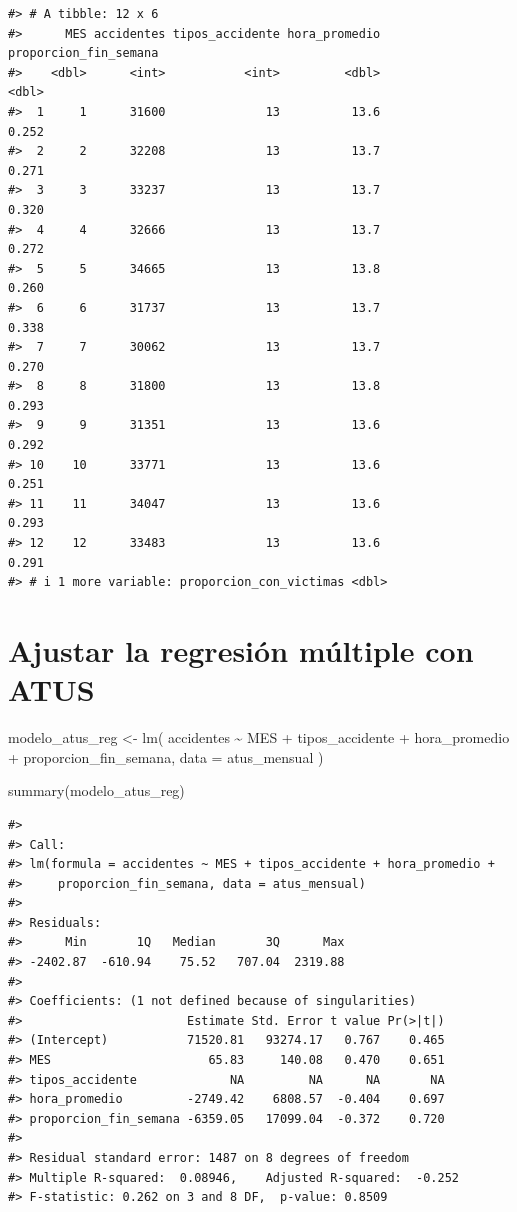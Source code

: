 \documentclass[
  spanish,
  10.5pt,
  letterpaper,
  openany,
  headings=big]{scrbook}
\newenvironment{Shaded}{}{}
\newcommand{\AttributeTok}[1]{\textcolor[rgb]{0.84,0.23,0.29}{#1}}
\newcommand{\FunctionTok}[1]{\textcolor[rgb]{0.44,0.26,0.76}{#1}}
\newcommand{\NormalTok}[1]{\textcolor[rgb]{0.14,0.16,0.18}{#1}}
\newcommand{\OtherTok}[1]{\textcolor[rgb]{0.44,0.26,0.76}{#1}}
\newcommand{\SpecialCharTok}[1]{\textcolor[rgb]{0.00,0.36,0.77}{#1}}
\begin{document}
\begin{verbatim}
#> # A tibble: 12 x 6
#>      MES accidentes tipos_accidente hora_promedio proporcion_fin_semana
#>    <dbl>      <int>           <int>         <dbl>                 <dbl>
#>  1     1      31600              13          13.6                 0.252
#>  2     2      32208              13          13.7                 0.271
#>  3     3      33237              13          13.7                 0.320
#>  4     4      32666              13          13.7                 0.272
#>  5     5      34665              13          13.8                 0.260
#>  6     6      31737              13          13.7                 0.338
#>  7     7      30062              13          13.7                 0.270
#>  8     8      31800              13          13.8                 0.293
#>  9     9      31351              13          13.6                 0.292
#> 10    10      33771              13          13.6                 0.251
#> 11    11      34047              13          13.6                 0.293
#> 12    12      33483              13          13.6                 0.291
#> # i 1 more variable: proporcion_con_victimas <dbl>
\end{verbatim}

\section{Ajustar la regresión múltiple con
ATUS}\label{ajustar-la-regresiuxf3n-muxfaltiple-con-atus}

\begin{Shaded}
\begin{Highlighting}[]
\NormalTok{modelo\_atus\_reg }\OtherTok{\textless{}{-}} \FunctionTok{lm}\NormalTok{(}
\NormalTok{  accidentes }\SpecialCharTok{\textasciitilde{}}\NormalTok{ MES }\SpecialCharTok{+}\NormalTok{ tipos\_accidente }\SpecialCharTok{+}
\NormalTok{    hora\_promedio }\SpecialCharTok{+}\NormalTok{ proporcion\_fin\_semana,}
  \AttributeTok{data =}\NormalTok{ atus\_mensual}
\NormalTok{)}

\FunctionTok{summary}\NormalTok{(modelo\_atus\_reg)}
\end{Highlighting}
\end{Shaded}

\begin{verbatim}
#> 
#> Call:
#> lm(formula = accidentes ~ MES + tipos_accidente + hora_promedio + 
#>     proporcion_fin_semana, data = atus_mensual)
#> 
#> Residuals:
#>      Min       1Q   Median       3Q      Max 
#> -2402.87  -610.94    75.52   707.04  2319.88 
#> 
#> Coefficients: (1 not defined because of singularities)
#>                       Estimate Std. Error t value Pr(>|t|)
#> (Intercept)           71520.81   93274.17   0.767    0.465
#> MES                      65.83     140.08   0.470    0.651
#> tipos_accidente             NA         NA      NA       NA
#> hora_promedio         -2749.42    6808.57  -0.404    0.697
#> proporcion_fin_semana -6359.05   17099.04  -0.372    0.720
#> 
#> Residual standard error: 1487 on 8 degrees of freedom
#> Multiple R-squared:  0.08946,    Adjusted R-squared:  -0.252 
#> F-statistic: 0.262 on 3 and 8 DF,  p-value: 0.8509
\end{verbatim}
\end{document}
